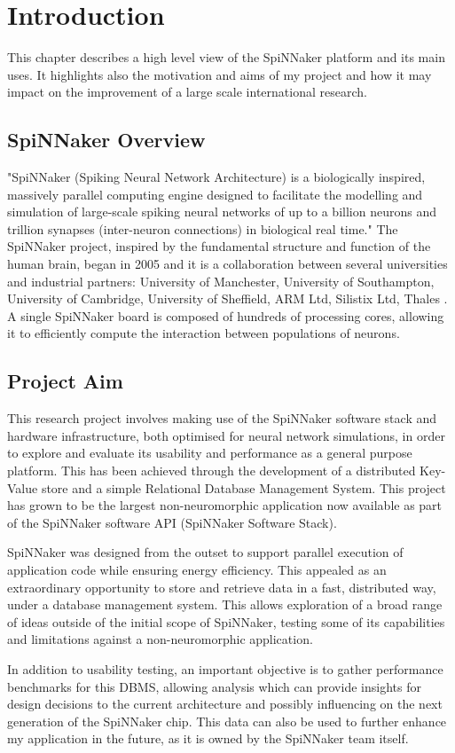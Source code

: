 \chapter{Introduction}
\label{cha:intro}

This chapter describes a high level view of the SpiNNaker platform and its main uses. It highlights also the motivation and aims of my project and how it may impact on the improvement of a large scale international research.

\section{SpiNNaker Overview}
\label{sec:overview}

"SpiNNaker (Spiking Neural Network Architecture) is a biologically inspired, massively parallel computing engine designed to facilitate the modelling and simulation of large-scale spiking neural networks of up to a billion neurons and trillion synapses (inter-neuron connections) in biological real time." \cite{painkras} The SpiNNaker project, inspired by the fundamental structure and function of the human brain, began in 2005 and it is a collaboration between several universities and industrial partners: University of Manchester, University of Southampton, University of Cambridge, University of Sheffield, ARM Ltd, Silistix Ltd, Thales \cite{spinnproject}. A single SpiNNaker board is composed of hundreds of processing cores, allowing it to efficiently compute the interaction between populations of neurons.

\section{Project Aim}
\label{sec:aim}

This research project involves making use of the SpiNNaker software stack and hardware infrastructure, both optimised for neural network simulations, in order to explore and evaluate its usability and performance as a general purpose platform. This has been achieved through the development of a distributed Key-Value store and a simple Relational Database Management System. 
This project has grown to be the largest non-neuromorphic application now available as part of the SpiNNaker software API (SpiNNaker Software Stack).

SpiNNaker was designed from the outset to support parallel execution of application code while ensuring energy efficiency. This appealed as an extraordinary opportunity to store and retrieve data in a fast, distributed way, under a database management system. This allows exploration of a broad range of ideas outside of the initial scope of SpiNNaker, testing some of its capabilities and limitations against a non-neuromorphic application.

In addition to usability testing, an important objective is to gather performance benchmarks for this DBMS, allowing analysis which can provide insights for design decisions to the current architecture and possibly influencing on the next generation of the SpiNNaker chip. This data can also be used to further enhance my application in the future, as it is owned by the SpiNNaker team itself.